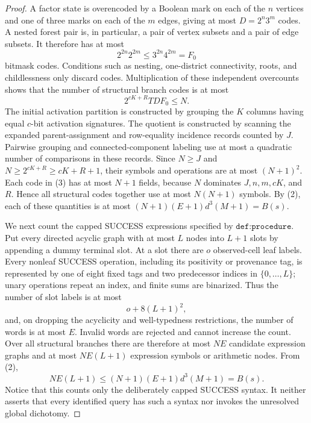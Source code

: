 \documentclass{article}
\begin{document}
\begin{proof}
A factor state is overencoded by a Boolean mark on each of the \(n\) vertices and one of three marks on each of the \(m\) edges, giving at most \(D=2^n3^m\) codes.  A nested forest pair is, in particular, a pair of vertex subsets and a pair of edge subsets.  It therefore has at most
\[
 2^{2n}2^{2m}\leq 3^{2n}4^{2m}=F_0
\]
bitmask codes.  Conditions such as nesting, one-district connectivity, roots, and childlessness only discard codes.  Multiplication of these independent overcounts shows that the number of structural branch codes is at most
\[
 2^{cK+R}TDF_0\leq N. \tag{3}
\]
The initial activation partition is constructed by grouping the \(K\) columns having equal \(c\)-bit activation signatures.  The quotient is constructed by scanning the expanded parent-assignment and row-equality incidence records counted by \(J\).  Pairwise grouping and connected-component labeling use at most a quadratic number of comparisons in these records.  Since \(N\geq J\) and \(N\geq 2^{cK+R}\geq cK+R+1\), their symbols and operations are at most \((N+1)^2\).  Each code in (3) has at most \(N+1\) fields, because \(N\) dominates \(J,n,m,cK\), and \(R\).  Hence all structural codes together use at most \(N(N+1)\) symbols.  By (2), each of these quantities is at most \((N+1)(E+1)d^3(M+1)=B(s)\).

We next count the capped SUCCESS expressions specified by \(\texttt{def:procedure}\).  Put every directed acyclic graph with at most \(L\) nodes into \(L+1\) slots by appending a dummy terminal slot.  At a slot there are \(o\) observed-cell leaf labels.  Every nonleaf SUCCESS operation, including its positivity or provenance tag, is represented by one of eight fixed tags and two predecessor indices in \(\{0,\ldots,L\}\); unary operations repeat an index, and finite sums are binarized.  Thus the number of slot labels is at most
\[
 o+8(L+1)^2,
\]
and, on dropping the acyclicity and well-typedness restrictions, the number of words is at most \(E\).  Invalid words are rejected and cannot increase the count.  Over all structural branches there are therefore at most \(NE\) candidate expression graphs and at most \(NE(L+1)\) expression symbols or arithmetic nodes.  From (2),
\[
 NE(L+1)
 \leq (N+1)(E+1)d^3(M+1)
 =B(s). \tag{4}
\]
Notice that this counts only the deliberately capped SUCCESS syntax.  It neither asserts that every identified query has such a syntax nor invokes the unresolved global dichotomy.


\end{proof}
\end{document}
